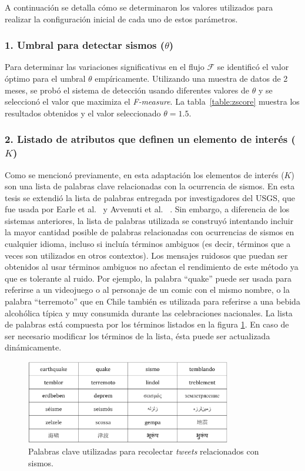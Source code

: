 	A continuación se detalla cómo se determinaron los valores utilizados para realizar la configuración inicial de cada uno de estos parámetros. 

	\subsubsection*{1. Umbral para detectar sismos ($\theta$)}
	Para determinar las variaciones significativas en el flujo $\mathcal{F}$ se identificó el valor óptimo para el umbral $\theta$ empíricamente. 
	Utilizando una muestra de datos de 2 meses, se probó el sistema de detección usando diferentes valores de $\theta$ y se seleccionó el valor que maximiza el {\em F-measure}.
	La tabla~\ref{table:zscore} muestra los resultados obtenidos y el valor seleccionado $\theta=1.5$.
	


	\subsubsection*{2. Listado de atributos que definen un elemento de interés ($K$)} 
	Como se mencionó previamente, en esta adaptación los elementos de interés ($K$) son una lista de palabras clave relacionadas con la ocurrencia de sismos.
	En esta tesis se extendió la lista de palabras entregada por investigadores del USGS, que fue usada por Earle et al.~\cite{earle2012twitter} y Avvenuti et al.~	\cite{avvenuti2014earthquake,avvenuti2014ears}.
	Sin embargo, a diferencia de los sistemas anteriores, la lista de palabras utilizada se construyó intentando incluir la mayor cantidad posible de palabras relacionadas con ocurrencias de sismos en cualquier idioma, incluso si incluía términos ambiguos (es decir, términos que a veces son utilizados en otros contextos).
	Los mensajes ruidosos que puedan ser obtenidos al usar términos ambiguos no afectan el rendimiento de este método ya que es tolerante al ruido. 
	Por ejemplo, la palabra ``quake'' puede ser usada para referirse a un videojuego o al personaje de un comic con el mismo nombre, o la palabra ``terremoto'' que en Chile también es utilizada para referirse a una bebida alcohólica típica y muy consumida durante las celebraciones nacionales. 
	La lista de palabras está compuesta por los términos listados en la figura \ref{img:keywords}. 
	En caso de ser necesario modificar los términos de la lista, ésta puede ser actualizada dinámicamente.
	
	\begin{figure}[h!]
	\centering
	\includegraphics[width=0.8\textwidth]{imagenes/Keywords.pdf}
	\caption{Palabras clave utilizadas para recolectar \textit{tweets} relacionados con sismos.}
	\label{img:keywords}
	\end{figure}
	
